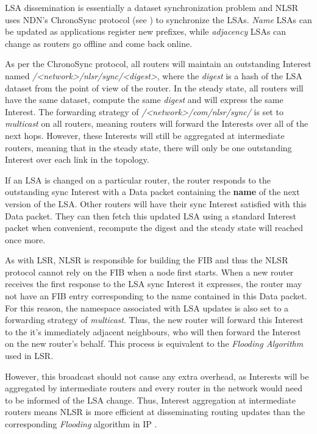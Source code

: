 LSA dissemination is essentially a dataset synchronization problem and NLSR uses NDN's ChronoSync protocol (see ) to synchronize the LSAs. \textit{Name} LSAs can be updated as applications register new prefixes, while \textit{adjacency} LSAs can change as routers go offline and come back online.

As per the ChronoSync protocol, all routers will maintain an outstanding Interest named \textit{/<network>/nlsr/sync/<digest>}, where the \textit{digest} is a hash of the LSA dataset from the point of view of the router. In the steady state, all routers will have the same dataset, compute the same \textit{digest} and will express the same Interest. The forwarding strategy of \textit{/<network>/com/nlsr/sync/} is set to \textit{multicast} on all routers, meaning routers will forward the Interests over all of the next hops. However, these Interests  will still be aggregated at intermediate routers, meaning that in the steady state, there will only be one outstanding Interest over each link in the topology.

If an LSA is changed on a particular router, the router responds to the outstanding sync Interest with a Data packet containing the \textbf{name} of the next version of the LSA. Other routers will have their sync Interest satisfied with this Data packet. They can then fetch this updated LSA using a standard Interest packet when convenient, recompute the digest and the steady state will reached once more.  

As with LSR, NLSR is responsible for building the FIB and thus the NLSR protocol cannot rely on the FIB when a node first starts.
When a new router receives the first response to the LSA sync Interest it expresses, the router may not have an FIB entry corresponding to the name contained in this Data packet. For this reason, the namespace associated with LSA updates is also set to a forwarding strategy of \textit{multicast}. Thus, the new router will forward this Interest to the it's immediately adjacent neighbours, who will then forward the Interest on the new router's behalf. This process is equivalent to the \textit{Flooding Algorithm} used in LSR. 

However, this broadcast should not cause any extra overhead, as Interests will be aggregated by intermediate routers and every router in the network would need to be informed of the LSA change. Thus, Interest aggregation at intermediate routers means NLSR is more efficient at disseminating routing updates than the corresponding \textit{Flooding} algorithm in IP \cite{nlsr}.



